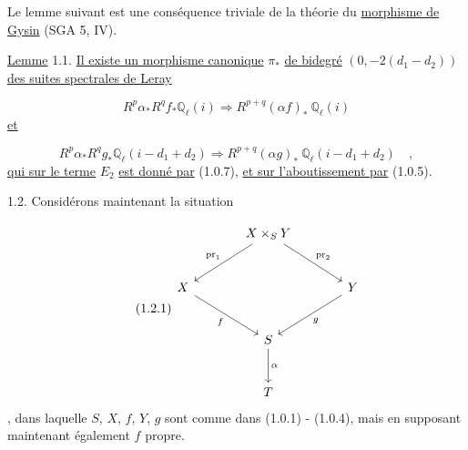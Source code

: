 Le lemme suivant est une conséquence triviale de la théorie du \underline{morphisme de Gysin} (SGA 5, IV).

\underline{Lemme} 1.1. \underline{Il existe un morphisme canonique} $\pi_*$ \underline{de bidegré} $(0,-2(d_1-d_2))$ \underline{des suites spectrales de Leray}

\begin{equation}\tag{1.1.0}
R^p \alpha_* R^q f_* \mathbb{Q}_\ell(i) \Longrightarrow R^{p+q}(\alpha f)_* \ \mathbb{Q}_\ell(i)
\end{equation}
\underline{et}

\begin{equation}\tag{1.1.1}
R^p \alpha_* R^q g_* \mathbb{Q}_\ell(i-d_1+d_2) \Longrightarrow R^{p+q}(\alpha g)_* \ \mathbb{Q}_\ell(i-d_1+d_2) \quad ,
\end{equation}
\underline{qui sur le terme} $E_2$ \underline{est donné par} (1.0.7), \underline{et sur l'aboutissement par} (1.0.5).

1.2. Considérons maintenant la situation

\begin{equation}\tag{1.2.1}
\begin{tikzcd}[column sep=large, row sep=large]
{} & X \times_S Y \arrow[dl, "\mathrm{pr}_1"'] \arrow[dr, "\mathrm{pr}_2"] & {} \\
X \arrow[dr, "f"'] & {} & Y \arrow[dl, "g"] \\
{} & S \arrow[d, "\alpha"] & {} \\
{} & T &
{} \end{tikzcd}
\end{equation}
,
dans laquelle $S$, $X$, $f$, $Y$, $g$ sont comme dans (1.0.1) - (1.0.4), mais en supposant maintenant également $f$ propre.

